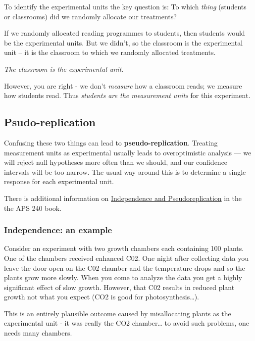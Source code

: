 \documentclass[
]{book}
\begin{document}
To identify the experimental units the key question is: To which \emph{thing} (students or classrooms) did we randomly allocate our treatments?

If we randomly allocated reading programmes to students, then students would be the experimental units. But we didn't, so the classroom is the experimental unit -- it is the classroom to which we randomly allocated treatments.

\emph{The classroom is the experimental unit}.

However, you are right - we don't \emph{measure} how a classroom reads; we measure how students read. Thus \emph{students are the measurement units} for this experiment.

\subsection{Psudo-replication}\label{psudo-replication}

Confusing these two things can lead to \textbf{pseudo-replication}. Treating measurement units as experimental usually leads to overoptimistic analysis --- we will reject null hypotheses more often than we should, and our confidence intervals will be too narrow. The usual way around this is to determine a single response for each experimental unit.

There is additional information on \href{https://dzchilds.github.io/stats-for-bio/principles-experimental-design.html\#independence}{Independence and Pseudoreplication} in the the APS 240 book.

\subsubsection{Independence: an example}\label{independence-an-example}

Consider an experiment with two growth chambers each containing 100 plants. One of the chambers received enhanced C02. One night after collecting data you leave the door open on the C02 chamber and the temperature drops and so the plants grow more slowly. When you come to analyze the data you get a highly significant effect of slow growth. However, that C02 results in reduced plant growth not what you expect (CO2 is good for photosynthesis\ldots).

This is an entirely plausible outcome caused by misallocating plants as the experimental unit - it was really the CO2 chamber\ldots{} to avoid such problems, one needs many chambers.
\end{document}
